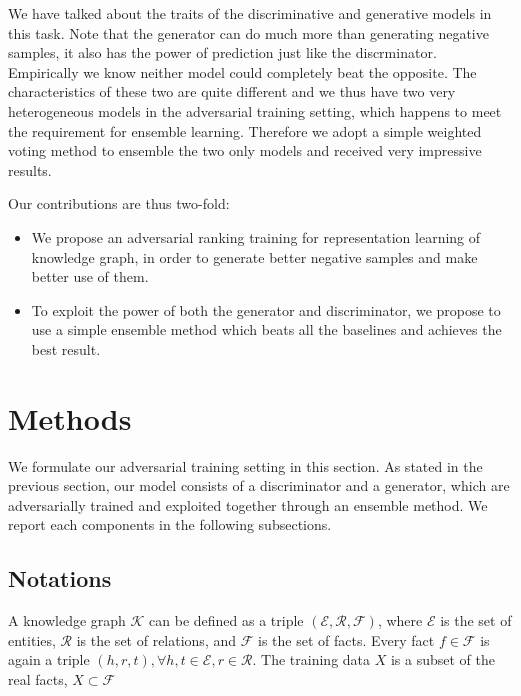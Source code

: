 \documentclass[twocolumn,a4paper,10pt,review,5p]{elsarticle}
\begin{document}
We have talked about the traits of the discriminative and generative models in this task. Note that the generator can do much more than generating negative samples, it also has the power of prediction just like the discrminator. Empirically we know neither model could completely beat the opposite. The characteristics of these two are quite different and we thus have two very heterogeneous models in the adversarial training setting, which happens to meet the requirement for ensemble learning. Therefore we adopt a simple weighted voting method to ensemble the two only models and received very impressive results.

Our contributions are thus two-fold:
\begin{itemize}
    \item We propose an adversarial ranking training for representation learning of knowledge graph, in order to generate better negative samples and make better use of them.
    \item To exploit the power of both the generator and discriminator, we propose to use a simple ensemble method which beats all the baselines and achieves the best result.
\end{itemize}




\section{Methods}

We formulate our adversarial training setting in this section. As stated in the previous section, our model consists of a discriminator and a generator, which are adversarially trained and exploited together through an ensemble method. We report each components in the following subsections.

\subsection{Notations}

A knowledge graph $\mathcal{K}$ can be defined as a triple $(\mathcal{E}, \mathcal{R}, \mathcal{F})$, where $\mathcal{E}$ is the set of entities, $\mathcal{R}$ is the set of relations, and $\mathcal{F}$ is the set of facts. Every fact $f\in \mathcal{F}$ is again a triple $(h, r, t), \forall h,t\in\mathcal{E}, r\in\mathcal{R}$. The training data $X$ is a subset of the real facts, $X \subset \mathcal{F}$
\end{document}
